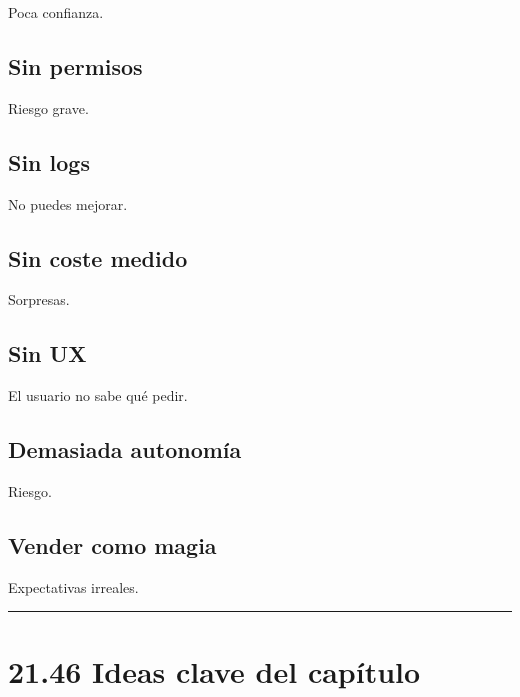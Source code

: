 Poca confianza.

\subsection{Sin permisos}\label{sin-permisos-2}

Riesgo grave.

\subsection{Sin logs}\label{sin-logs-2}

No puedes mejorar.

\subsection{Sin coste medido}\label{sin-coste-medido}

Sorpresas.

\subsection{Sin UX}\label{sin-ux}

El usuario no sabe qué pedir.

\subsection{Demasiada autonomía}\label{demasiada-autonomuxeda}

Riesgo.

\subsection{Vender como magia}\label{vender-como-magia}

Expectativas irreales.

\begin{center}\rule{0.5\linewidth}{0.5pt}\end{center}

\section{21.46 Ideas clave del
capítulo}\label{ideas-clave-del-capuxedtulo-20}

